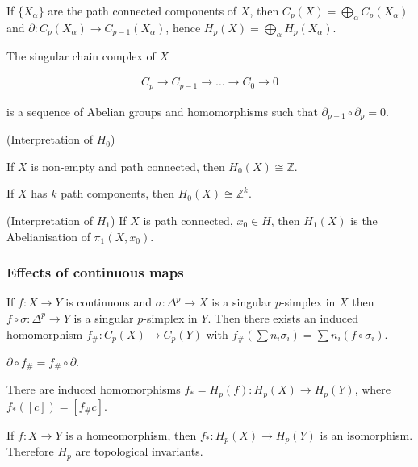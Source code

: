 \begin{lem}
If $\{X_{\alpha}\}$ are the path connected components of $X$, then
$C_{p}(X)=\bigoplus_{\alpha}C_{p}(X_{\alpha})$ and $\partial:C_{p}(X_{\alpha})\to C_{p-1}(X_{\alpha})$,
hence $H_{p}(X)=\bigoplus_{\alpha}H_{p}(X_{\alpha})$.\end{lem}
\begin{defn}
The singular chain complex of $X$

\begin{align*}
C_{p}\to C_{p-1}\to\dots\to C_{0}\to0
\end{align*}


is a sequence of Abelian groups and homomorphisms such that $\partial_{p-1}\circ\partial_{p}=0$.\end{defn}
\begin{thm}
(Interpretation of $H_{0}$)

If $X$ is non-empty and path connected, then $H_{0}(X)\cong\mathbb{Z}$.\end{thm}
\begin{cor}
If $X$ has $k$ path components, then $H_{0}(X)\cong\mathbb{Z}^{k}$.\end{cor}
\begin{thm}
(Interpretation of $H_{1}$) If $X$ is path connected, $x_{0}\in H$,
then $H_{1}(X)$ is the Abelianisation of $\pi_{1}(X,x_{0})$.
\end{thm}

\subsubsection{Effects of continuous maps}

If $f:X\to Y$ is continuous and $\sigma:\Delta^{p}\to X$ is a singular
$p$-simplex in $X$ then $f\circ\sigma:\Delta^{p}\to Y$ is a singular
$p$-simplex in $Y$. Then there exists an induced homomorphism $f_{\#}:C_{p}(X)\to C_{p}(Y)$
with $f_{\#}\left(\sum n_{i}\sigma_{i}\right)=\sum n_{i}(f\circ\sigma_{i})$.
\begin{lem}
$\partial\circ f_{\#}=f_{\#}\circ\partial$.\end{lem}
\begin{thm}
There are induced homomorphisms $f_{*}=H_{p}(f):H_{p}(X)\to H_{p}(Y)$,
where $f_{*}([c])=[f_{\#}c]$.\end{thm}
\begin{cor}
If $f:X\to Y$ is a homeomorphism, then $f_{*}:H_{p}(X)\to H_{p}(Y)$
is an isomorphism. Therefore $H_{p}$ are topological invariants.
\end{cor}

